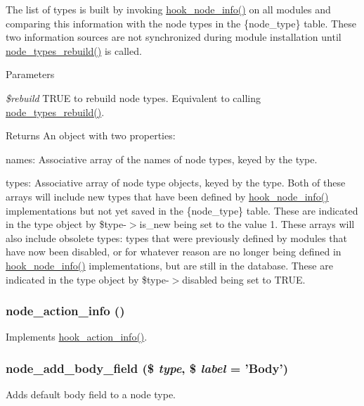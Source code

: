The list of types is built by invoking \hyperlink{group__node__api__hooks_ga3b6ad51d7815d1cdd093b0e0f350cbd0}{hook\_\-node\_\-info()} on all modules and comparing this information with the node types in the \{node\_\-type\} table. These two information sources are not synchronized during module installation until \hyperlink{node_8module_a0d871bf17b30ff5048cbc1abff3a075a}{node\_\-types\_\-rebuild()} is called.


\begin{DoxyParams}{Parameters}
\item[{\em \$rebuild}]TRUE to rebuild node types. Equivalent to calling \hyperlink{node_8module_a0d871bf17b30ff5048cbc1abff3a075a}{node\_\-types\_\-rebuild()}.\end{DoxyParams}
\begin{DoxyReturn}{Returns}
An object with two properties:
\begin{DoxyItemize}
\item names: Associative array of the names of node types, keyed by the type.
\item types: Associative array of node type objects, keyed by the type. Both of these arrays will include new types that have been defined by \hyperlink{group__node__api__hooks_ga3b6ad51d7815d1cdd093b0e0f350cbd0}{hook\_\-node\_\-info()} implementations but not yet saved in the \{node\_\-type\} table. These are indicated in the type object by \$type-\/$>$is\_\-new being set to the value 1. These arrays will also include obsolete types: types that were previously defined by modules that have now been disabled, or for whatever reason are no longer being defined in \hyperlink{group__node__api__hooks_ga3b6ad51d7815d1cdd093b0e0f350cbd0}{hook\_\-node\_\-info()} implementations, but are still in the database. These are indicated in the type object by \$type-\/$>$disabled being set to TRUE. 
\end{DoxyItemize}
\end{DoxyReturn}
\hypertarget{node_8module_a684fb56e46d0090df253d784e6403f35}{
\subsubsection[{node\_\-action\_\-info}]{\setlength{\rightskip}{0pt plus 5cm}node\_\-action\_\-info ()}}
\label{node_8module_a684fb56e46d0090df253d784e6403f35}
Implements \hyperlink{group__actions_ga3df26c5d6496c91fcd0edd8648023fb4}{hook\_\-action\_\-info()}. \hypertarget{node_8module_ae42eca558c69d1e327c82a554ceba42f}{
\subsubsection[{node\_\-add\_\-body\_\-field}]{\setlength{\rightskip}{0pt plus 5cm}node\_\-add\_\-body\_\-field (\$ {\em type}, \/  \$ {\em label} = {\ttfamily 'Body'})}}
\label{node_8module_ae42eca558c69d1e327c82a554ceba42f}
Adds default body field to a node type.


